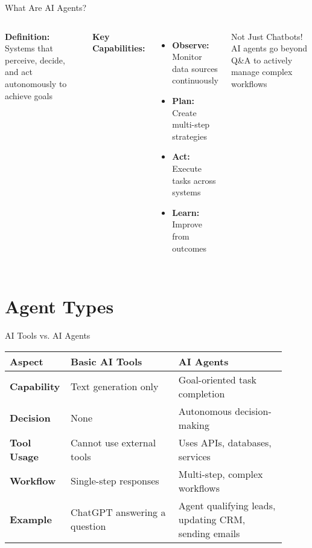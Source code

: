 \documentclass{beamer}
\begin{document}
\begin{frame}{What Are AI Agents?}
  \begin{columns}[onlytextwidth]
      \textbf{Definition:} Systems that perceive, decide, and act autonomously to achieve goals
      
      \vspace{0.3cm}
      \textbf{Key Capabilities:}
      \begin{itemize}
        \item \textbf{Observe:} Monitor data sources continuously
        \item \textbf{Plan:} Create multi-step strategies
        \item \textbf{Act:} Execute tasks across systems
        \item \textbf{Learn:} Improve from outcomes
      \end{itemize}
    
      \begin{block}{Not Just Chatbots!}
        AI agents go beyond Q\&A to actively manage complex workflows
      \end{block}
  \end{columns}
\end{frame}

\section{Agent Types}

\begin{frame}{AI Tools vs. AI Agents}
  \centering
  \footnotesize
  \begin{tabular}{|p{0.15\linewidth}|p{0.38\linewidth}|p{0.38\linewidth}|}
    \hline
    \textbf{Aspect} & \textbf{Basic AI Tools} & \textbf{AI Agents} \\ \hline
    \textbf{Capability} & Text generation only & Goal-oriented task completion \\ \hline
    \textbf{Decision} & None & Autonomous decision-making \\ \hline
    \textbf{Tool Usage} & Cannot use external tools & Uses APIs, databases, services \\ \hline
    \textbf{Workflow} & Single-step responses & Multi-step, complex workflows \\ \hline
    \rowcolor{blue!10}
    \textbf{Example} & ChatGPT answering a question & Agent qualifying leads, updating CRM, sending emails \\ \hline
  \end{tabular}
\end{frame}
\end{document}
